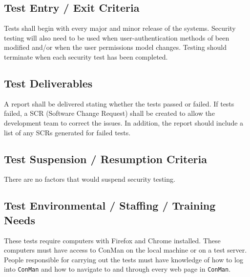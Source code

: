 \documentclass{article}
\begin{document}
\subsection{Test Entry / Exit Criteria}
Tests shall begin with every major and minor release of the systems. Security testing 
will also need to be used when user-authentication methods of been modified and/or 
when the user permissions model changes. Testing should terminate when each security 
test has been completed. 

\subsection{Test Deliverables}
A report shall be delivered stating whether the tests passed or failed. If tests failed, a SCR
(Software Change Request) shall be created to allow the development team to correct the
issues. In addition, the report should include a list of any SCRs generated for failed 
tests.


\subsection{Test Suspension / Resumption Criteria}
There are no factors that would suspend security testing.

\subsection{Test Environmental / Staffing / Training Needs}
These tests require computers with Firefox and Chrome installed. These computers must
have access to ConMan on the local machine or on a test server. People responsible for
carrying out the tests must have knowledge of how to log into \texttt{ConMan} and how to 
navigate to and through every web page in \texttt{ConMan}.
\end{document}
